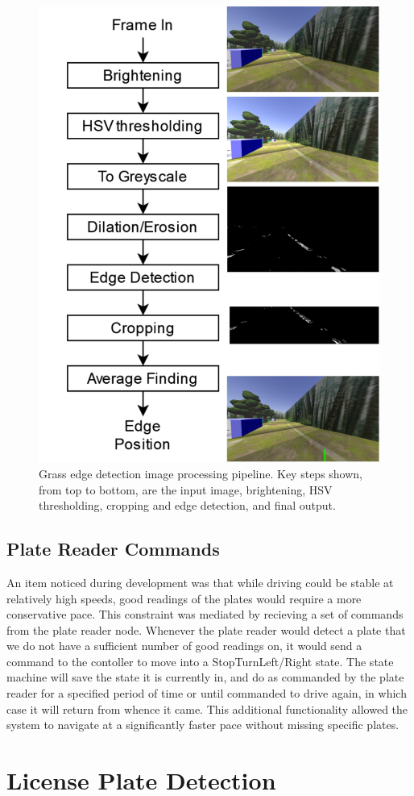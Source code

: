 \documentclass[titlepage, twocolumn]{article}
\begin{document}
            \begin{figure}
                \begin{center}
                    \includegraphics[width=0.5\linewidth]{grass-photos.png}
                \end{center}
                \caption{Grass edge detection image processing pipeline. Key steps shown, from top to bottom, are the input image, brightening, HSV thresholding, cropping and edge detection, and final output.}
                \label{fig:grasspipeline}
            \end{figure}

    \subsection{Plate Reader Commands} \label{platereadercontrol}

    An item noticed during development was that while driving could be stable at relatively high speeds, good readings of the plates would require a more conservative pace. This constraint was mediated by recieving a set of commands from the plate reader node. Whenever the plate reader would detect a plate that we do not have a sufficient number of good readings on, it would send a command to the contoller to move into a StopTurn{Left/Right} state. The state machine will save the state it is currently in, and do as commanded by the plate reader for a specified period of time or until commanded to drive again, in which case it will return from whence it came. This additional functionality allowed the system to navigate at a significantly faster pace without missing specific plates.


\section{License Plate Detection}
\end{document}
